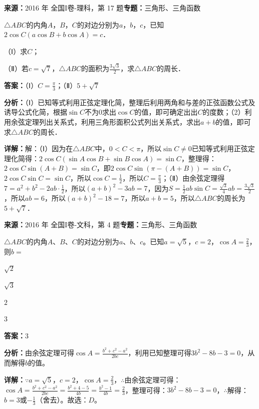 \begin{question}[points=12]
\textbf{来源：}2016 年 全国I卷-理科，第 17 题\quad \textbf{专题：}三角形、三角函数\par
$\triangle ABC$的内角$A$，$B$，$C$的对边分别为$a$，$b$，$c$，已知$2\cos C(a\cos B+b\cos A)=c$．

（Ⅰ）求$C$；

（Ⅱ）若$c=\sqrt{7}$，$\triangle ABC$的面积为$\frac{3\sqrt{3}}{2}$，求$\triangle ABC$的周长．
\begin{solution}
\textbf{答案：}（Ⅰ）$C=\frac{\pi}{3}$；（Ⅱ）$5+\sqrt{7}$

\textbf{分析：}（Ⅰ）已知等式利用正弦定理化简，整理后利用两角和与差的正弦函数公式及诱导公式化简，根据$\sin C$不为$0$求出$\cos C$的值，即可确定出出$C$的度数；（2）利用余弦定理列出关系式，利用三角形面积公式列出关系式，求出$a+b$的值，即可求$\triangle ABC$的周长．

\textbf{详解：}解：（Ⅰ）因为在$\triangle ABC$中，$0<C<\pi$，所以$\sin C\neq0$已知等式利用正弦定理化简得：$2\cos C(\sin A\cos B+\sin B\cos A)=\sin C$，整理得：$2\cos C\sin(A+B)=\sin C$，即$2\cos C\sin(\pi-(A+B))=\sin C$，$2\cos C\sin C=\sin C$，所以$\cos C=\frac{1}{2}$，所以$C=\frac{\pi}{3}$；（Ⅱ）由余弦定理得$7=a^2+b^2-2ab\cdot\frac{1}{2}$，所以$(a+b)^2-3ab=7$，因为$S=\frac{1}{2}ab\sin C=\frac{\sqrt{3}}{4}ab=\frac{3\sqrt{3}}{2}$，所以$ab=6$，所以$(a+b)^2-18=7$，所以$a+b=5$，所以$\triangle ABC$的周长为$5+\sqrt{7}$．
\end{solution}
\end{question}

\begin{question}[points=5]
\textbf{来源：}2016 年 全国I卷-文科，第 4 题\quad \textbf{专题：}三角形、三角函数\par
$\triangle ABC$的内角$A$、$B$、$C$的对边分别为$a$、$b$、$c$。已知$a=\sqrt{5}$，$c=2$，$\cos A=\frac{2}{3}$，则$b=$
\begin{choices}
  \item $\sqrt{2}$
  \item $\sqrt{3}$
  \item $2$
  \item $3$
\end{choices}
\begin{solution}
\textbf{答案：}$3$

\textbf{分析：}由余弦定理可得$\cos A=\frac{b^2+c^2-a^2}{2bc}$，利用已知整理可得$3b^2-8b-3=0$，从而解得$b$的值。

\textbf{详解：}$\because a=\sqrt{5}$，$c=2$，$\cos A=\frac{2}{3}$，$\therefore$由余弦定理可得：$\cos A=\frac{b^2+c^2-a^2}{2bc}=\frac{b^2+4-5}{4b}=\frac{b^2-1}{4b}=\frac{2}{3}$，整理可得：$3b^2-8b-3=0$，$\therefore$解得：$b=3$或$-\frac{1}{3}$（舍去）。故选：$D$。
\end{solution}
\end{question}

